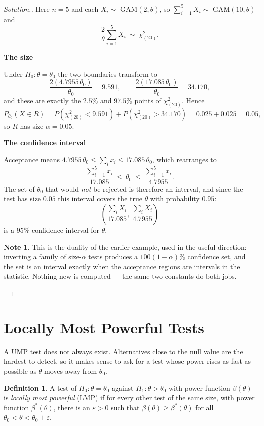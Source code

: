 \documentclass[12pt,a4paper]{report}
\theoremstyle{definition}
\newtheorem{defn}[thm]{Definition}
\newtheorem*{note}{Note}
\newcommand{\subhead}[1]{%
  \par\medskip\noindent\textbf{#1}\par\nobreak\smallskip}
\newenvironment{solution}
  {\renewcommand{\qedsymbol}{}\begin{proof}[\textit{Solution}.]}
  {\end{proof}}
\begin{document}
\begin{solution}
Here $n=5$ and each $X_i\sim$ GAM$(2,\theta)$, so
$\sum_{i=1}^{5}X_i \sim$ GAM$(10,\theta)$ and
\[\frac{2}{\theta}\sum_{i=1}^{5}X_i \ \sim\ \chi^{2}_{(20)} .\]

\subhead{The size}
Under $H_0:\theta=\theta_0$ the two boundaries transform to
\[\frac{2(4.7955\,\theta_0)}{\theta_0} = 9.591,
\qquad \frac{2(17.085\,\theta_0)}{\theta_0} = 34.170,\]
and these are exactly the $2.5\%$ and $97.5\%$ points of $\chi^{2}_{(20)}$.
Hence
\[P_{\theta_0}(X\in R) = P\left(\chi^{2}_{(20)}<9.591\right)
+ P\left(\chi^{2}_{(20)}>34.170\right) = 0.025+0.025 = 0.05 ,\]
so $R$ has size $\alpha=0.05$.

\subhead{The confidence interval}
Acceptance means $4.7955\,\theta_0 \leq \sum_i x_i \leq 17.085\,\theta_0$, which
rearranges to
\[\frac{\sum_{i=1}^{5}x_i}{17.085} \ \leq\ \theta_0 \ \leq\ \frac{\sum_{i=1}^{5}x_i}{4.7955} .\]
The set of $\theta_0$ that would \emph{not} be rejected is therefore an
interval, and since the test has size $0.05$ this interval covers the true
$\theta$ with probability $0.95$:
\[\left(\frac{\sum_i X_i}{17.085},\ \frac{\sum_i X_i}{4.7955}\right)\]
is a $95\%$ confidence interval for $\theta$.

\begin{note}
This is the duality of the earlier example, used in the useful direction:
inverting a family of size-$\alpha$ tests produces a $100(1-\alpha)\%$
confidence set, and the set is an interval exactly when the acceptance regions
are intervals in the statistic. Nothing new is computed --- the same two
constants do both jobs.
\end{note}
\end{solution}

\section{Locally Most Powerful Tests}

A UMP test does not always exist. Alternatives close to the null value are the hardest
to detect, so it makes sense to ask for a test whose power rises as fast as possible
as $\theta$ moves away from $\theta_0$.

\begin{defn}
\label{def:lmp}
A test of $H_0\colon\theta = \theta_0$ against $H_1\colon\theta>\theta_0$ with power function
$\beta(\theta)$ is \emph{locally most powerful} (LMP) if for every other test of the
same size, with power function $\beta^*(\theta)$, there is an $\varepsilon>0$ such that
$\beta(\theta)\ge\beta^*(\theta)$ for all $\theta_0<\theta<\theta_0 + \varepsilon$.
\end{defn}
\end{document}
